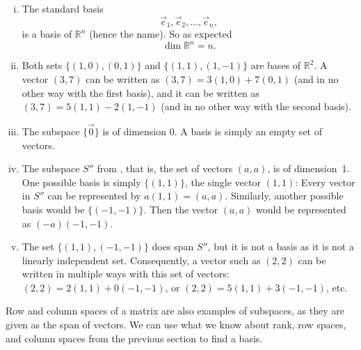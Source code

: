 \begin{example}
\begin{enumerate}[(i)]
\item
The standard basis
\begin{equation*}
\vec{e}_1, \vec{e}_2, \ldots, \vec{e}_n ,
\end{equation*}
is a basis of ${\mathbb R}^n$ (hence the name).
So as expected
\begin{equation*}
\dim {\mathbb R}^n = n .
\end{equation*}
\item
Both sets $\bigl\{ (1,0) , (0,1) \bigr\}$ and
$\bigl\{ (1,1), (1,-1) \bigr\}$ are
bases of ${\mathbb{R}}^2$.  A vector $(3,7)$ can
be written as
$(3,7)=3 (1,0) + 7 (0,1)$
(and in no other way with the first basis),
and it can be written as
$(3,7)=5 (1,1) - 2(1,-1)$
(and in no other way with the second basis).
\item
The subspace $\{ \vec{0} \}$ is of dimension $0$.
A basis is simply an empty set of vectors.
\item
The subspace $S''$ from , that is, the set of
vectors $(a,a)$, is of dimension~1.  One possible basis is simply
$\bigl\{ (1,1) \bigr\}$, the single
vector $(1,1)$: Every vector in $S''$ can be represented by $a (1,1) =
(a,a)$.  Similarly, another possible basis would be
$\bigl\{ (-1,-1) \bigr\}$.  Then
the vector $(a,a)$ would be represented as $(-a) (-1,-1)$.
\item
The set $\bigl\{ (1,1) , (-1,-1) \bigr\}$ does
span $S''$, but it is not a basis as it is not a linearly independent set.
Consequently, a vector such as $(2,2)$ can be written in multiple
ways with this set of vectors:
$(2,2) = 2(1,1) + 0 (-1,-1)$,
or
$(2,2) = 5(1,1) + 3 (-1,-1)$, etc.
\end{enumerate}
\end{example}

Row and column spaces of a matrix are also examples of
subspaces,
as they are given as the span of vectors.
We can use
what we know about rank, row spaces, and column spaces
from the previous section to find a basis.

